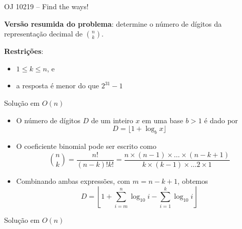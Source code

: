 \begin{frame}[fragile]{OJ 10219 -- Find the ways!}

    \textbf{Versão resumida do problema}: determine o número de dígitos da representação decimal
        de $\binom{n}{k}$.
            
    \vspace{0.1in}

    \textbf{Restrições}:
    \begin{itemize}
        \item $1\leq k\leq n$, e
        \item a resposta é menor do que $2^{31} - 1$
    \end{itemize}
\end{frame}

\begin{frame}[fragile]{Solução em $O(n)$}

    \begin{itemize}
        \item O número de dígitos $D$ de um inteiro $x$ em uma base $b > 1$ é dado por
        $$
            D = \lfloor 1 + \log_b x\rfloor
        $$

        \item O coeficiente binomial pode ser escrito como
        $$
            \binom{n}{k} = \frac{n!}{(n - k)!k!} = \frac{n\times (n - 1)\times \ldots \times
                (n - k + 1)}{k\times (k - 1)\times \ldots 2 \times 1}
        $$

        \item Combinando ambas expressões, com $m = n - k + 1$, obtemos
        $$
            D = \left\lfloor 1 + \sum_{i = m}^n \log_{10} i - \sum_{i = 1}^k \log_{10} i \right\rfloor
        $$
    \end{itemize}

\end{frame}

\begin{frame}[fragile]{Solução em $O(n)$}
\end{frame}
